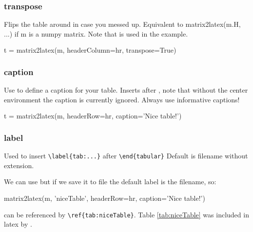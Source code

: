 \subsubsection{transpose}
Flips the table around in case you messed up. Equivalent to
matrix2latex(m.H, ...)
if m is a numpy matrix.
Note that  is used in the example.
\begin{pyblock}
t = matrix2latex(m, headerColumn=hr, transpose=True)
\end{pyblock}

\subsubsection{caption}
Use to define a caption for your table.
Inserts  after ,
note that without the center environment the caption is currently ignored.
Always use informative captions!
\begin{pyblock}
t = matrix2latex(m, headerRow=hr,
                 caption='Nice table!')
\end{pyblock}

\subsubsection{label}
Used to insert \verb!\label{tab:...}! after \verb!\end{tabular}!
Default is filename without extension.

We can use  but if we save it to file
the default label is the filename, so:
\begin{pyblock}
matrix2latex(m, 'niceTable', headerRow=hr, 
                 caption='Nice table!')
\end{pyblock}
can be referenced by \verb!\ref{tab:niceTable}!. Table \ref{tab:niceTable}
was included in latex by \verb!!.


